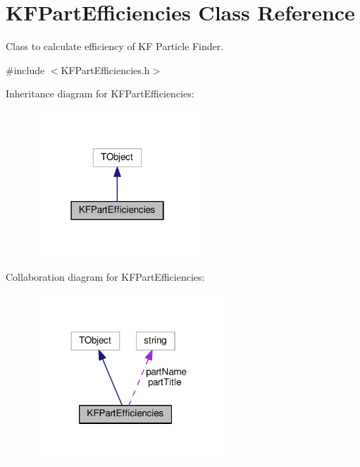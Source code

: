 \hypertarget{classKFPartEfficiencies}{}\section{K\+F\+Part\+Efficiencies Class Reference}
\label{classKFPartEfficiencies}


Class to calculate efficiency of KF Particle Finder.  




{\ttfamily \#include $<$K\+F\+Part\+Efficiencies.\+h$>$}



Inheritance diagram for K\+F\+Part\+Efficiencies\+:
\nopagebreak
\begin{figure}[H]
\begin{center}
\leavevmode
\includegraphics[width=178pt]{classKFPartEfficiencies__inherit__graph}
\end{center}
\end{figure}


Collaboration diagram for K\+F\+Part\+Efficiencies\+:
\nopagebreak
\begin{figure}[H]
\begin{center}
\leavevmode
\includegraphics[width=203pt]{classKFPartEfficiencies__coll__graph}
\end{center}
\end{figure}
